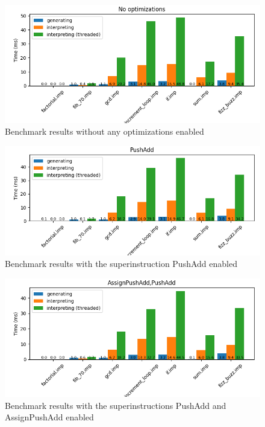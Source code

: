 \documentclass{article}
\begin{document}
\begin{figure}[h]
    \centering
    \includegraphics[width=1\textwidth]{../BenchmarkImages/No_Optimizations.png}
    \caption{Benchmark results without any optimizations enabled}
    \label{fig:no_op}
\end{figure}

\begin{figure}[h]
    \centering
    \includegraphics[width=1\textwidth]{../BenchmarkImages/PushAdd.png}
    \caption{Benchmark results with the superinstruction PushAdd enabled}
    \label{fig:push_add}
\end{figure}

\begin{figure}[h]
    \centering
    \includegraphics[width=1\textwidth]{../BenchmarkImages/AssignPushAdd_PushAdd.png}
    \caption{Benchmark results with the superinstructions PushAdd and AssignPushAdd enabled}
    \label{fig:push_add_apa}
\end{figure}
\end{document}
